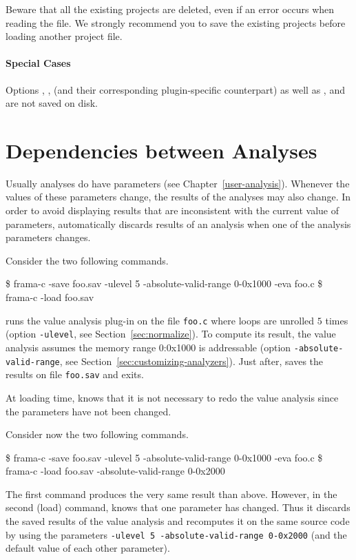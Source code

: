 \begin{important}
Beware that all the existing projects are deleted, even if an error occurs when
reading the file. We strongly recommend you to save the existing projects before
loading another project file.
\end{important}

\paragraph{Special Cases}

Options , ,
\xspace(and
their corresponding plugin-specific counterpart)
as well as , \xspace and
\xspace are not saved on disk.

\section{Dependencies between Analyses}

Usually analyses do have parameters (see Chapter~\ref{user-analysis}). Whenever
the values of these parameters change, the results of the analyses may also
change. In order to avoid displaying results that are inconsistent with the
current value of parameters, \FramaC automatically discards results of an
analysis when one of the analysis parameters changes.

Consider the two following
commands.%
\begin{frama-c-commands}
\$ frama-c -save foo.sav -ulevel 5 -absolute-valid-range 0-0x1000 -eva foo.c
\$ frama-c -load foo.sav
\end{frama-c-commands}
\FramaC runs the value analysis plug-in on the file \texttt{foo.c} where loops
are unrolled $5$ times (option \texttt{-ulevel}, see
Section~\ref{sec:normalize}). To compute its result, the value analysis
assumes the memory range 0:0x1000 is addressable  (option
\texttt{-absolute-valid-range}, see Section~\ref{sec:customizing-analyzers}).
Just
after, \FramaC saves the results on file \texttt{foo.sav} and exits.

At loading time, \FramaC knows that it is not necessary to redo the value
analysis since the parameters have not been changed.

Consider now the two following commands.
%
\begin{frama-c-commands}
\$ frama-c -save foo.sav -ulevel 5 -absolute-valid-range 0-0x1000 -eva foo.c
\$ frama-c -load foo.sav -absolute-valid-range 0-0x2000
\end{frama-c-commands}
The first command produces the very same result than above. However, in the
second (load) command, \FramaC knows that one parameter has changed. Thus it
discards the saved results of the value analysis and recomputes it on the same
source code by using the parameters
\texttt{-ulevel 5 -absolute-valid-range 0-0x2000} (and the
default value of each other parameter).


